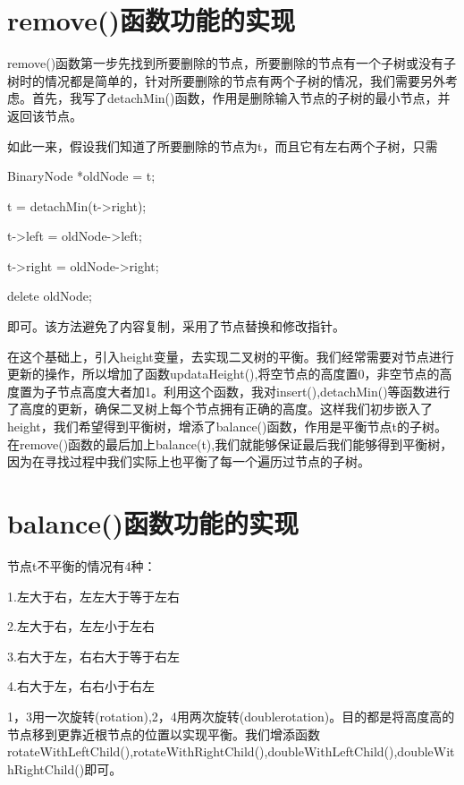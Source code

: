 \documentclass[UTF8]{ctexart}
\begin{document}
\pagestyle{fancy}
\fancyhead{}

\section{remove()函数功能的实现}
\hspace{0em}remove()函数第一步先找到所要删除的节点，所要删除的节点有一个子树或没有子树时的情况都是简单的，针对所要删除的节点有两个子树的情况，我们需要另外考虑。首先，我写了detachMin()函数，作用是删除输入节点的子树的最小节点，并返回该节点。

如此一来，假设我们知道了所要删除的节点为t，而且它有左右两个子树，只需

BinaryNode *oldNode = t;

t = detachMin(t->right);

t->left = oldNode->left;

t->right = oldNode->right;

delete oldNode;

即可。该方法避免了内容复制，采用了节点替换和修改指针。

在这个基础上，引入height变量，去实现二叉树的平衡。我们经常需要对节点进行更新的操作，所以增加了函数updataHeight(),将空节点的高度置0，非空节点的高度置为子节点高度大者加1。利用这个函数，我对insert(),detachMin()等函数进行了高度的更新，确保二叉树上每个节点拥有正确的高度。这样我们初步嵌入了height，我们希望得到平衡树，增添了balance()函数，作用是平衡节点t的子树。在remove()函数的最后加上balance(t),我们就能够保证最后我们能够得到平衡树，因为在寻找过程中我们实际上也平衡了每一个遍历过节点的子树。

\section{balance()函数功能的实现}
\hspace{0em}节点t不平衡的情况有4种：


1.左大于右，左左大于等于左右

2.左大于右，左左小于左右

3.右大于左，右右大于等于右左

4.右大于左，右右小于右左

1，3用一次旋转(rotation),2，4用两次旋转(doublerotation)。目的都是将高度高的节点移到更靠近根节点的位置以实现平衡。我们增添函数rotateWithLeftChild(),rotateWithRightChild(),doubleWithLeftChild(),doubleWithRightChild()即可。
\end{document}
